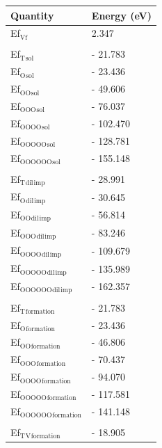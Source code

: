 \documentclass[11pt]{article}
\begin{document}
\begin{center}
\begin{tabular}{ll}
Quantity & Energy (eV)\\
\hline
Ef\(_{\text{Vf}}\) & 2.347\\
 & \\
Ef\(_{\text{T}}\)\(_{\text{sol}}\) & -  21.783\\
Ef\(_{\text{O}}\)\(_{\text{sol}}\) & -  23.436\\
Ef\(_{\text{OO}}\)\(_{\text{sol}}\) & -  49.606\\
Ef\(_{\text{OOO}}\)\(_{\text{sol}}\) & -  76.037\\
Ef\(_{\text{OOOO}}\)\(_{\text{sol}}\) & - 102.470\\
Ef\(_{\text{OOOOO}}\)\(_{\text{sol}}\) & - 128.781\\
Ef\(_{\text{OOOOOO}}\)\(_{\text{sol}}\) & - 155.148\\
 & \\
Ef\(_{\text{T}}\)\(_{\text{dil}}\)\(_{\text{imp}}\) & -  28.991\\
Ef\(_{\text{O}}\)\(_{\text{dil}}\)\(_{\text{imp}}\) & -  30.645\\
Ef\(_{\text{OO}}\)\(_{\text{dil}}\)\(_{\text{imp}}\) & -  56.814\\
Ef\(_{\text{OOO}}\)\(_{\text{dil}}\)\(_{\text{imp}}\) & -  83.246\\
Ef\(_{\text{OOOO}}\)\(_{\text{dil}}\)\(_{\text{imp}}\) & - 109.679\\
Ef\(_{\text{OOOOO}}\)\(_{\text{dil}}\)\(_{\text{imp}}\) & - 135.989\\
Ef\(_{\text{OOOOOO}}\)\(_{\text{dil}}\)\(_{\text{imp}}\) & - 162.357\\
 & \\
Ef\(_{\text{T}}\)\(_{\text{formation}}\) & -  21.783\\
Ef\(_{\text{O}}\)\(_{\text{formation}}\) & -  23.436\\
Ef\(_{\text{OO}}\)\(_{\text{formation}}\) & -  46.806\\
Ef\(_{\text{OOO}}\)\(_{\text{formation}}\) & -  70.437\\
Ef\(_{\text{OOOO}}\)\(_{\text{formation}}\) & -  94.070\\
Ef\(_{\text{OOOOO}}\)\(_{\text{formation}}\) & - 117.581\\
Ef\(_{\text{OOOOOO}}\)\(_{\text{formation}}\) & - 141.148\\
 & \\
Ef\(_{\text{T}}\)\(_{\text{V}}\)\(_{\text{formation}}\) & -  18.905\\

\end{tabular}
\end{center}
\end{document}

